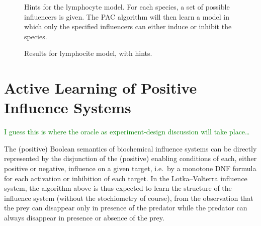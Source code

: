 \documentclass{llncs}
\newcommand{\sylvain}[1]{\textcolor{green}{#1}}
\begin{document}
\begin{figure}
	
	\caption{Hints for the lymphocyte model. For each species, a set of possible influencers is given. The PAC algorithm will then learn a model in which only the specified influencers can either induce or inhibit the species.\label{hints}}
\end{figure}
\begin{figure}
	
	\caption{Results for lymphocite model, with hints.\label{hints.res}}
\end{figure}


\section{Active Learning of Positive Influence Systems}
\label{sec:oracles}

\sylvain{I guess this is where the oracle as experiment-design discussion will
take place\dots}

The (positive) Boolean semantics of biochemical influence systems
can be directly represented by the disjunction of the (positive) enabling conditions of each, either positive or negative, influence on a given target,
i.e.~by a monotone DNF formula for each activation or inhibition of each target.
In the Lotka--Volterra influence system, the algorithm above is thus expected to learn the structure of the influence system
(without the stochiometry of course),
from the observation that the prey can disappear only in presence of the predator
while the predator can always disappear in presence or absence of the prey.
\end{document}
